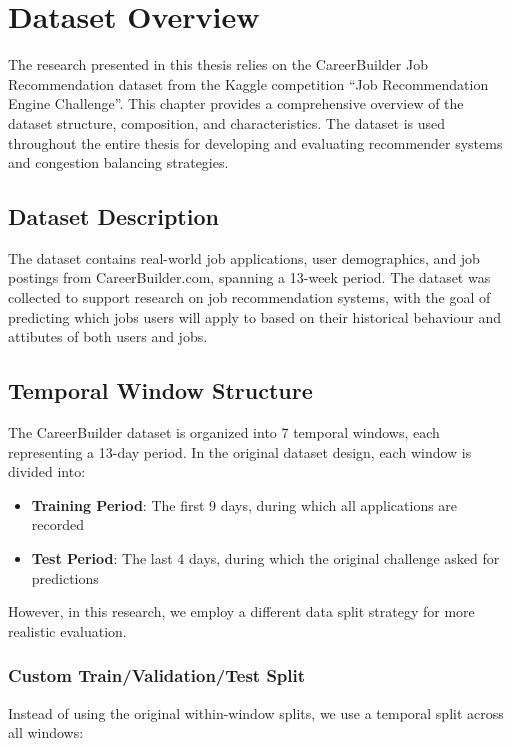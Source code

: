 \chapter{Dataset Overview}
\label{chap:dataset_overview}

The research presented in this thesis relies on the CareerBuilder Job Recommendation dataset from the Kaggle competition ``Job Recommendation Engine Challenge''. This chapter provides a comprehensive overview of the dataset structure, composition, and characteristics. The dataset is used throughout the entire thesis for developing and evaluating recommender systems and congestion balancing strategies.

\section{Dataset Description}
\label{sec:dataset_description}

The dataset contains real-world job applications, user demographics, and job postings from CareerBuilder.com, spanning a 13-week period. The dataset was collected to support research on job recommendation systems, with the goal of predicting which jobs users will apply to based on their historical behaviour and attibutes of both users and jobs. 
\section{Temporal Window Structure}
\label{sec:temporal_windows}

The CareerBuilder dataset is organized into 7 temporal windows, each representing a 13-day period. In the original dataset design, each window is divided into:
\begin{itemize}
    \item \textbf{Training Period}: The first 9 days, during which all applications are recorded
    \item \textbf{Test Period}: The last 4 days, during which the original challenge asked for predictions
\end{itemize}

However, in this research, we employ a different data split strategy for more realistic evaluation.

\subsection{Custom Train/Validation/Test Split}
\label{sec:custom_split}
Instead of using the original within-window splits, we use a temporal split across all windows:

